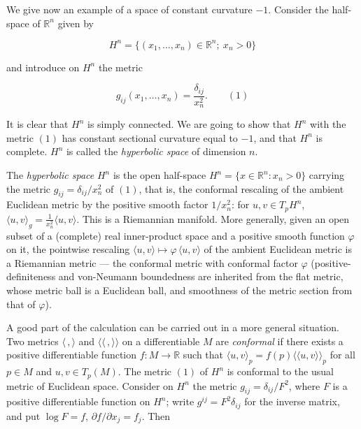 We give now an example of a space of constant curvature $-1$. Consider the
half-space of $\mathbb{R}^n$ given by

$$
H^n=\{(x_1,\dots,x_n)\in\mathbb{R}^n;\ x_n>0\}
$$

and introduce on $H^n$ the metric

$$
g_{ij}(x_1,\dots,x_n)=\frac{\delta_{ij}}{x_n^2}.\qquad(1)
$$

It is clear that $H^n$ is simply connected. We are going to show that $H^n$ with
the metric $(1)$ has constant sectional curvature equal to $-1$, and that $H^n$ is
complete. $H^n$ is called the \emph{hyperbolic space} of dimension $n$.

\begin{definition}
  \label{def:dc-ch8-3-hyperbolic-space}
  \leanok
  The \emph{hyperbolic space} $H^n$ is the open half-space
  $H^n=\{x\in\mathbb R^n : x_n>0\}$ carrying the metric $g_{ij}=\delta_{ij}/x_n^2$
  of $(1)$, that is, the conformal rescaling of the ambient Euclidean metric by
  the positive smooth factor $1/x_n^2$: for $u,v\in T_pH^n$,
  $\langle u,v\rangle_g=\tfrac{1}{x_n^2}\langle u,v\rangle$. This is a Riemannian
  manifold. More generally, given an open subset of a (complete) real
  inner-product space and a positive smooth function $\varphi$ on it, the
  pointwise rescaling $\langle u,v\rangle\mapsto\varphi\,\langle u,v\rangle$ of
  the ambient Euclidean metric is a Riemannian metric — the conformal metric with
  conformal factor $\varphi$ (positive-definiteness and von-Neumann boundedness
  are inherited from the flat metric, whose metric ball is a Euclidean ball, and
  smoothness of the metric section from that of $\varphi$).
\end{definition}

A good part of the calculation can be carried out in a more general situation. Two
metrics $\langle\,,\rangle$ and $\langle\!\langle\,,\rangle\!\rangle$ on a
differentiable $M$ are \emph{conformal} if there exists a positive differentiable
function $f:M\to\mathbb{R}$ such that
$\langle u,v\rangle_p=f(p)\langle\!\langle u,v\rangle\!\rangle_p$ for all $p\in M$
and $u,v\in T_p(M)$. The metric $(1)$ of $H^n$ is conformal to the usual metric of
Euclidean space. Consider on $H^n$ the metric $g_{ij}=\delta_{ij}/F^2$, where $F$
is a positive differentiable function on $H^n$; write $g^{ij}=F^2\delta_{ij}$ for
the inverse matrix, and put $\log F=f$, $\partial f/\partial x_j=f_j$. Then

